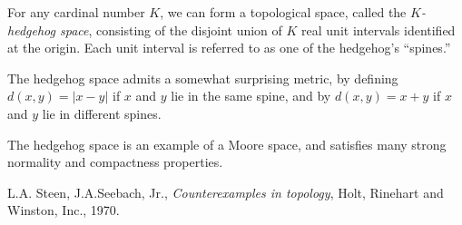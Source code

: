 \documentclass[12pt]{article}
\newcommand{\<}{\langle}
\renewcommand{\>}{\rangle}
\begin{document}
For any cardinal number $K$, we can form a topological space, called the \emph{$K$-hedgehog space}, consisting of the disjoint union of $K$ real unit intervals identified at the origin.  Each unit interval is referred to as one of the hedgehog's ``spines.''

The hedgehog space admits a somewhat surprising metric, by defining $d(x,y)=|x-y|$ if $x$ and $y$ lie in the same spine, and by $d(x,y)=x+y$ if $x$ and $y$ lie in different spines.

The hedgehog space is an example of a Moore space, and satisfies many strong normality and compactness properties.

\begin{thebibliography}{1}
 L.A. Steen, J.A.Seebach, Jr.,
\emph{Counterexamples in topology},
Holt, Rinehart and Winston, Inc., 1970.
\end{thebibliography}

\end{document}
